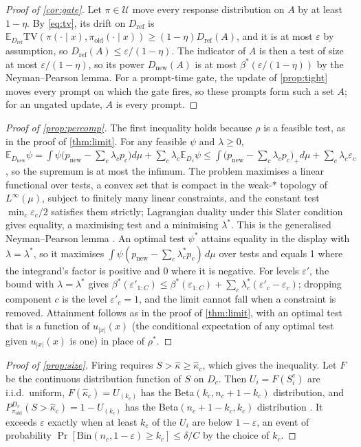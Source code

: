 \documentclass{article}
\theoremstyle{plain}
\theoremstyle{definition}
\theoremstyle{remark}
\newcommand{\E}{\mathbb{E}}
\newcommand{\TV}{\mathrm{TV}}
\newcommand{\Dref}{D_{\mathrm{ref}}}
\newcommand{\Dnew}{D_{\mathrm{new}}}
\newcommand{\pold}{\pi_{\mathrm{old}}}
\begin{document}
\begin{proof}[Proof of \cref{cor:gate}]
Let $\pi\in\mathcal U$ move every response distribution on $A$ by at least $1-\eta$. By \cref{eq:tv}, its drift on
$\Dref$ is $\E_{\Dref}\TV(\pi(\cdot\mid x),\pold(\cdot\mid x))\ge(1-\eta)\Dref(A)$, and it is at most $\varepsilon$
by assumption, so $\Dref(A)\le\varepsilon/(1-\eta)$. The indicator of $A$ is then a test of size at most
$\varepsilon/(1-\eta)$, so its power $\Dnew(A)$ is at most $\beta^\ast(\varepsilon/(1-\eta))$ by the Neyman--Pearson
lemma. For a prompt-time gate, the update of \cref{prop:tight} moves every prompt on which the gate fires, so these
prompts form such a set $A$; for an ungated update, $A$ is every prompt.
\end{proof}

\begin{proof}[Proof of \cref{prop:percomp}]
The first inequality holds because $\rho$ is a feasible test, as in the proof of \cref{thm:limit}. For any feasible
$\psi$ and $\lambda\ge0$,
$\E_{\Dnew}\psi=\int\psi\big(p_{\mathrm{new}}-\sum_c\lambda_cp_c\big)d\mu+\sum_c\lambda_c\E_{D_c}\psi
\le\int\big(p_{\mathrm{new}}-\sum_c\lambda_cp_c\big)_+d\mu+\sum_c\lambda_c\varepsilon_c$, so the supremum is at most
the infimum. The problem maximises a linear functional over tests, a convex set that is compact in the weak-$\ast$
topology of $L^\infty(\mu)$, subject to finitely many linear constraints, and the constant test $\min_c\varepsilon_c/2$
satisfies them strictly; Lagrangian duality under this Slater condition gives equality, a maximising test and a
minimising $\lambda^\ast$. This is the generalised Neyman--Pearson lemma \citep{dantzig1951fundamental,lehmann2022testing}.
An optimal test $\psi^\ast$ attains equality in the display with $\lambda=\lambda^\ast$, so it maximises
$\int\psi(p_{\mathrm{new}}-\sum_c\lambda^\ast_cp_c)\,d\mu$ over tests and equals 1 where the integrand's factor is
positive and 0 where it is negative. For levels $\varepsilon'$, the bound with $\lambda=\lambda^\ast$ gives
$\beta^\ast(\varepsilon'_{1:C})\le\beta^\ast(\varepsilon_{1:C})+\sum_c\lambda^\ast_c(\varepsilon'_c-\varepsilon_c)$;
dropping component $c$ is the level $\varepsilon'_c=1$, and the limit cannot fall when a constraint is removed.
Attainment follows as in the proof of \cref{thm:limit}, with an optimal test that is a function of $u_{|x|}(x)$ (the
conditional expectation of any optimal test given $u_{|x|}(x)$ is one) in place of $\rho^\ast$.
\end{proof}

\begin{proof}[Proof of \cref{prop:size}]
Firing requires $S>\hat\kappa\ge\hat\kappa_c$, which gives the inequality. Let $F$ be the continuous distribution
function of $S$ on $D_c$. Then $U_i=F(S^c_i)$ are i.i.d.\ uniform, $F(\hat\kappa_c)=U_{(k_c)}$ has the
Beta$(k_c,n_c+1-k_c)$ distribution, and $P^{D_c}_{\pold}(S>\hat\kappa_c)=1-U_{(k_c)}$ has the Beta$(n_c+1-k_c,k_c)$
distribution \citep{vovk2012conditional}. It exceeds $\varepsilon$ exactly when at least $k_c$ of the $U_i$ are below
$1-\varepsilon$, an event of probability $\Pr[\mathrm{Bin}(n_c,1-\varepsilon)\ge k_c]\le\delta/C$ by the choice of $k_c$.
\end{proof}
\end{document}
